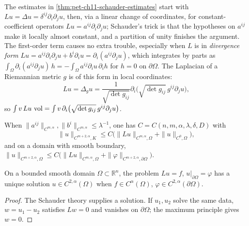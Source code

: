 \begin{remark}
  \label{rem:pet-ch11-divergence-form-laplace-beltrami}

  The estimates in \cref{thm:pet-ch11-schauder-estimates} start with
  $Lu=\Delta u=\delta^{ij}\partial_i\partial_ju$,
  then, via a linear change of coordinates, for constant-coefficient
  operators $Lu=a^{ij}\partial_i\partial_ju$; Schauder's trick is that the
  hypotheses on $a^{ij}$ make it locally almost constant, and a partition of
  unity finishes the argument. The first-order term causes no extra trouble,
  especially when $L$ is in \emph{divergence form}
  $Lu=a^{ij}\partial_i\partial_ju+b^i\partial_iu=\partial_i(a^{ij}\partial_ju)$,
  which integrates by parts as
  $\int_\Omega\partial_i(a^{ij}\partial_ju)\,h=-\int_\Omega a^{ij}\partial_iu\,\partial_ih$
  for $h=0$ on $\partial\Omega$. The Laplacian of a Riemannian metric $g$ is of
  this form in local coordinates:
  \[
    Lu=\Delta_gu=\frac1{\sqrt{\det g_{ij}}}\partial_i\big(\sqrt{\det g_{ij}}\,g^{ij}\partial_ju\big),
  \]
  so $\int v\,Lu\,\operatorname{vol}=\int v\,\partial_i\big(\sqrt{\det g_{ij}}\,g^{ij}\partial_ju\big)$.
\end{remark}

\begin{corollary}
  \label{cor:pet-ch11-higher-schauder-estimates}

  When $\|a^{ij}\|_{C^{m,\alpha}},\|b^i\|_{C^{m,\alpha}}\le\lambda^{-1}$,
  one has $C=C(n,m,\alpha,\lambda,\delta,D)$ with
  \[
    \|u\|_{C^{m+2,\alpha},K}\le C\big(\|Lu\|_{C^{m,\alpha},\Omega}+\|u\|_{C^0,\Omega}\big),
  \]
  and on a domain with smooth boundary,
  $\|u\|_{C^{m+2,\alpha},\Omega}\le C\big(\|Lu\|_{C^{m,\alpha},\Omega}+\|\varphi\|_{C^{m+2,\alpha},\partial\Omega}\big)$.
\end{corollary}

\begin{theorem}
  \label{thm:pet-ch11-dirichlet-problem-unique-solution}

  On a bounded smooth domain $\Omega\subset\mathbb{R}^n$, the problem
  $Lu=f$, $u|_{\partial\Omega}=\varphi$ has a unique
  solution $u\in C^{2,\alpha}(\Omega)$ when $f\in C^\alpha(\Omega)$,
  $\varphi\in C^{2,\alpha}(\partial\Omega)$.
\end{theorem}
\begin{proof}
  \sketch
  The Schauder theory supplies a solution. If \(u_1,u_2\) solve the same data, \(w=u_1-u_2\) satisfies \(Lw=0\) and vanishes on \(\partial\Omega\); the maximum principle gives \(w=0\).
\end{proof}


